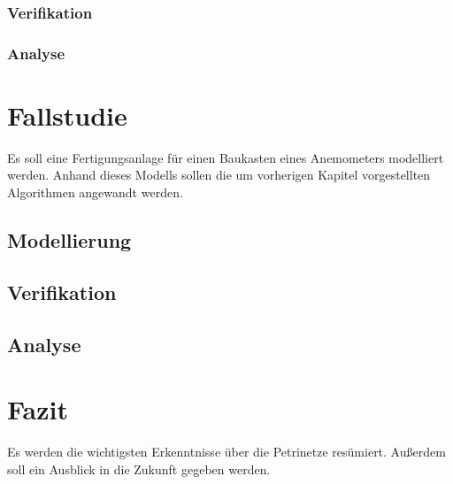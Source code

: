 \documentclass{article}
\begin{document}
\subsubsection{Verifikation}
\subsubsection{Analyse}

\section{Fallstudie}
Es soll eine Fertigungsanlage für einen Baukasten eines Anemometers modelliert werden.
Anhand dieses Modells sollen die um vorherigen Kapitel vorgestellten Algorithmen angewandt werden.
\subsection{Modellierung}
\subsection{Verifikation}
\subsection{Analyse}

\section{Fazit}
Es werden die wichtigsten Erkenntnisse über die Petrinetze resümiert.
Außerdem soll ein Ausblick in die Zukunft gegeben werden.
\end{document}
